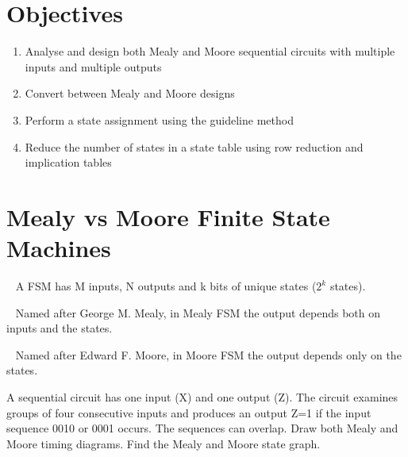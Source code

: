 \section{Objectives}
\begin{enumerate}
  \item Analyse and design both Mealy and Moore sequential circuits with multiple inputs and multiple outputs
  \item Convert between Mealy and Moore designs
  \item Perform a state assignment using the guideline method
   \item Reduce the number of states in a state table using row reduction and
     implication tables
\end{enumerate}

\section{Mealy vs Moore Finite State Machines}
\begin{definition}~\cite[Sec~3.4]{harris2022digital}
  A FSM has M inputs, N outputs and k bits of unique states ($2^k$ states).
\end{definition}

\begin{definition}~\cite[Sec~3.4.3]{harris2022digital}
  Named after George M. Mealy, in Mealy FSM the output depends both on inputs and the states.
\end{definition}

\begin{definition}~\cite[Sec~3.4.3]{harris2022digital}
  Named after Edward F. Moore, in Moore FSM the output depends only on the states.
\end{definition}


\begin{example}
  A sequential circuit has one input (X) and one output (Z). The circuit
  examines groups of four consecutive inputs and produces an output Z=1 if the
  input sequence 0010 or 0001 occurs. The sequences can overlap. Draw both Mealy
  and Moore timing diagrams. Find the Mealy and Moore state graph.
\end{example}
\vspace{20em}

